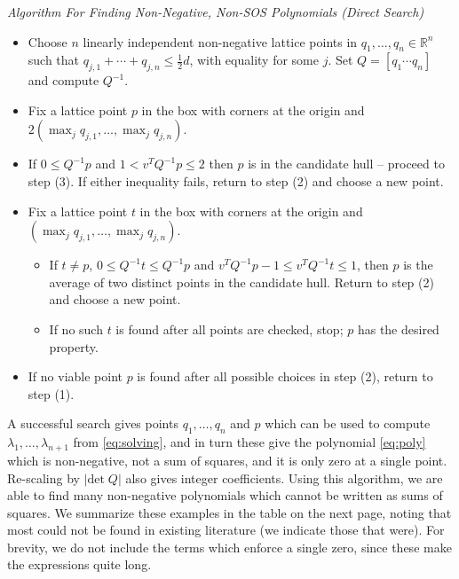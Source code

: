 \documentclass[oneside,hidelinks,indentfirst,10pt]{book}
\begin{document}
\medskip

\noindent\textit{Algorithm For Finding Non-Negative, Non-SOS Polynomials (Direct Search)}
\begin{itemize}
    \item[(1)] Choose \(n\) linearly independent non-negative lattice points in \(q_1,\dots,q_n\in\mathbb{R}^n\) such that \(q_{j,1}+\cdots+q_{j,n}\leq \frac{1}{2}d\), with equality for some \(j\). Set \(Q=[q_1\cdots q_n]\) and compute \(Q^{-1}\).
    \item[(2)] Fix a lattice point \(p\) in the box with corners at the origin and \(2(\max_jq_{j,1},\dots,\max_{j}q_{j,n})\).
    \item[(3)] If \(0\leq Q^{-1}p\) and \(1<v^TQ^{-1}p\leq 2\) then \(p\) is in the candidate hull -- proceed to step (3). If either inequality fails, return to step (2) and choose a new point.
    \item[(4)] Fix a lattice point \(t\) in the box with corners at the origin and \((\max_jq_{j,1},\dots,\max_{j}q_{j,n})\). 
    \begin{itemize}
        \item[(4a)] If \(t\neq p\), \(0\leq Q^{-1}t\leq Q^{-1}p\) and \(v^TQ^{-1}p-1\leq v^TQ^{-1}t\leq 1\), then \(p\) is the average of two distinct points in the candidate hull. Return to step (2) and choose a new point.
        \item[(4b)] If no such \(t\) is found after all points are checked, stop; \(p\) has the desired property.
    \end{itemize}
    \item[(7)] If no viable point \(p\) is found after all possible choices in step (2), return to step (1).
\end{itemize}

\medskip

A successful search gives points \(q_1,\dots,q_n\) and \(p\) which can be used to compute \(\lambda_1,\dots,\lambda_{n+1}\) from \eqref{eq:solving}, and in turn these give the polynomial \eqref{eq:poly} which is non-negative, not a sum of squares, and it is only zero at a single point. Re-scaling by \(|\mathrm{det}\;Q|\) also gives integer coefficients. Using this algorithm, we are able to find many non-negative polynomials which cannot be written as sums of squares. We summarize these examples in the table on the next page, noting that most could not be found in existing literature (we indicate those that were). For brevity, we do not include the terms which enforce a single zero, since these make the expressions quite long.
\end{document}
